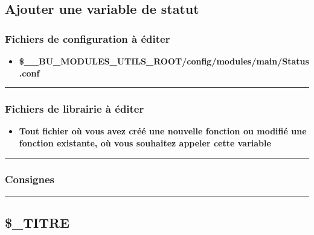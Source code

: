 \documentclass[a4paper,10pt]{article}
\begin{document}
\color{green}
\subsection{Ajouter une variable de statut}\color{white}

\color{blue}
\subsubsection{Fichiers de configuration à éditer}\color{white}
\begin{itemize}
    \item \textbf{\color{orange}\$\_\_BU\_MODULES\_UTILS\_ROOT\color{lime}/config/modules/main/Status.conf}
\end{itemize}


\color{blue}\par\noindent\rule{\textwidth}{0.4pt}\color{white}

\color{blue}
\subsubsection{Fichiers de librairie à éditer}\color{white}
\begin{itemize}
    \item \textbf{Tout fichier où vous avez créé une nouvelle fonction ou modifié une fonction existante, où vous souhaitez appeler cette variable}
\end{itemize}


\color{blue}\par\noindent\rule{\textwidth}{0.4pt}\color{white}

\color{blue}
\subsubsection{Consignes}\color{white}



\color{green}\par\noindent\rule{\textwidth}{0.4pt}\color{white}

\color{green}
\subsection{\$\_TITRE}\color{white}

\color{blue}
\end{document}
